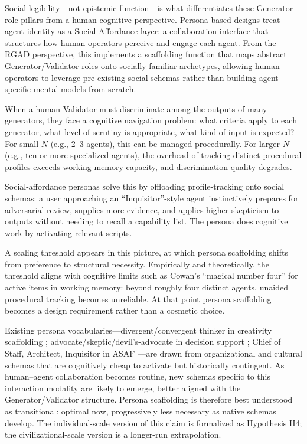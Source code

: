 \documentclass[11pt,a4paper]{article}
\begin{document}
Social legibility---not epistemic function---is what differentiates these Generator-role pillars from a human cognitive perspective. Persona-based designs treat agent identity as a Social Affordance layer: a collaboration interface that structures how human operators perceive and engage each agent. From the RGAD perspective, this implements a scaffolding function that maps abstract Generator/Validator roles onto socially familiar archetypes, allowing human operators to leverage pre-existing social schemas rather than building agent-specific mental models from scratch.

When a human Validator must discriminate among the outputs of many generators, they face a cognitive navigation problem: what criteria apply to each generator, what level of scrutiny is appropriate, what kind of input is expected? For small $N$ (e.g., 2--3 agents), this can be managed procedurally. For larger $N$ (e.g., ten or more specialized agents), the overhead of tracking distinct procedural profiles exceeds working-memory capacity, and discrimination quality degrades.

Social-affordance personas solve this by offloading profile-tracking onto social schemas: a user approaching an ``Inquisitor''-style agent instinctively prepares for adversarial review, supplies more evidence, and applies higher skepticism to outputs without needing to recall a capability list. The persona does cognitive work by activating relevant scripts.

A scaling threshold appears in this picture, at which persona scaffolding shifts from preference to structural necessity. Empirically and theoretically, the threshold aligns with cognitive limits such as Cowan's ``magical number four'' for active items in working memory: beyond roughly four distinct agents, unaided procedural tracking becomes unreliable. At that point persona scaffolding becomes a design requirement rather than a cosmetic choice.

Existing persona vocabularies---divergent/convergent thinker in creativity scaffolding \citep{epperson2025}; advocate/skeptic/devil's-advocate in decision support \citep{kumar2025}; Chief of Staff, Architect, Inquisitor in ASAF \citep{lee2026}---are drawn from organizational and cultural schemas that are cognitively cheap to activate but historically contingent. As human--agent collaboration becomes routine, new schemas specific to this interaction modality are likely to emerge, better aligned with the Generator/Validator structure. Persona scaffolding is therefore best understood as transitional: optimal now, progressively less necessary as native schemas develop. The individual-scale version of this claim is formalized as Hypothesis H4; the civilizational-scale version is a longer-run extrapolation.
\end{document}
